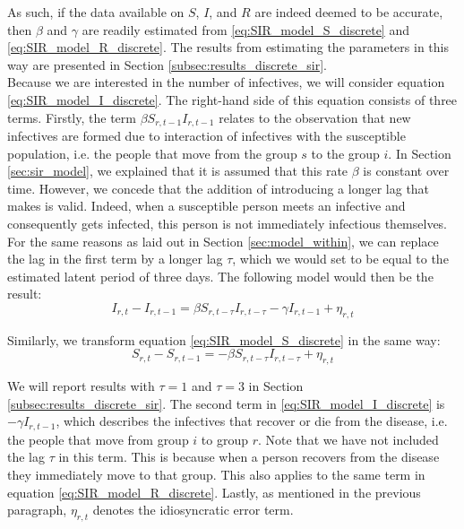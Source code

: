 \documentclass[12pt]{article}
\begin{document}
	As such, if the data available on $S$, $I$, and $R$ are indeed deemed to be accurate, then $\beta$ and $\gamma$ are readily estimated from \ref{eq:SIR_model_S_discrete} and \ref{eq:SIR_model_R_discrete}. The results from estimating the parameters in this way are presented in Section \ref{subsec:results_discrete_sir}. \\
	
	Because we are interested in the number of infectives, we will consider equation \eqref{eq:SIR_model_I_discrete}. The right-hand side of this equation consists of three terms. Firstly, the term $\beta S_{r,t-1}I_{r,t-1}$ relates to the observation that new infectives are formed due to interaction of infectives with the susceptible population, i.e. the people that move from the group $s$ to the group $i$. In Section \ref{sec:sir_model}, we explained that it is assumed that this rate $\beta$ is constant over time. However, we concede that the addition of introducing a longer lag that \textcite{adda2016economic} makes is valid. Indeed, when a susceptible person meets an infective and consequently gets infected, this person is not immediately infectious themselves. For the same reasons as laid out in Section \ref{sec:model_within}, we can replace the lag in the first term by a longer lag $\tau$, which we would set to be equal to the estimated latent period of three days. The following model would then be the result:
	    \begin{equation}\label{eq:SIR_model_I_discrete_tau}
            I_{r,t} - I_{r,t-1} = \beta S_{r,t-\tau}I_{r,t-\tau} - \gamma I_{r,t-1} + \eta_{r,t}
        \end{equation}
	
	Similarly, we transform equation \eqref{eq:SIR_model_S_discrete} in the same way:
	    \begin{equation}\label{eq:SIR_model_S_discrete_tau}
            S_{r,t} - S_{r,t-1} = -\beta S_{r,t-\tau}I_{r,t-\tau} + \eta_{r,t}
        \end{equation}
	
	We will report results with $\tau=1$ and $\tau=3$ in Section \ref{subsec:results_discrete_sir}. The second term in \eqref{eq:SIR_model_I_discrete} is $-\gamma I_{r,t-1}$, which describes the infectives that recover or die from the disease, i.e. the people that move from group $i$ to group $r$. Note that we have not included the lag $\tau$ in this term. This is because when a person recovers from the disease they immediately move to that group. This also applies to the same term in equation \eqref{eq:SIR_model_R_discrete}. Lastly, as mentioned in the previous paragraph, $\eta_{r,t}$ denotes the idiosyncratic error term. \\
	
\end{document}
